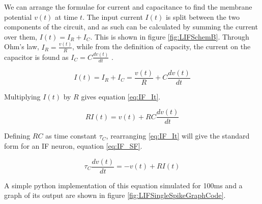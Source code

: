 We can arrange the formulae for current and capacitance to find the membrane
potential $v(t)$ at time $t$. The input current $I(t)$ is split between the two
components of the circuit, and as such can be calculated by summing the current
over them, $I(t) = I_R + I_C$. This is shown in figure \ref{fig:LIFSchemB}.
Through Ohm's law, $I_R = \frac{v(t)}{R}$, while from the definition of capacity,
the current on the capacitor is found as
$I_C = C \frac{d v(t)}{d t}$ \autocite{gerstner_spiking_2002}.

\begin{equation}\label{eq:IF_Itpre}
    I(t) = I_R + I_C = \frac{v(t)}{R} + C \frac{d v(t)}{d t}
\end{equation}

Multiplying $I(t)$
by $R$ gives equation \ref{eq:IF_It}.

\begin{equation}\label{eq:IF_It}
    R I(t) = v(t) + R C \frac{d v(t)}{d t}
\end{equation}

Defining $RC$ as time constant $\tau_C$, rearranging \ref{eq:IF_It} will
give the standard form for an IF neuron, equation \ref{eq:IF_SF}. \autocite{burkitt_review_2006,trappenberg_fundamentals_2009,teeter_generalized_2018}

\begin{equation}\label{eq:IF_SF}
    \tau_C \frac{d v(t)}{d t} = - v(t) + R I(t)
\end{equation}

A simple python implementation of this equation simulated for 100ms and a graph
of its output are shown in figure \ref{fig:LIFSingleSpikeGraphCode}. 

